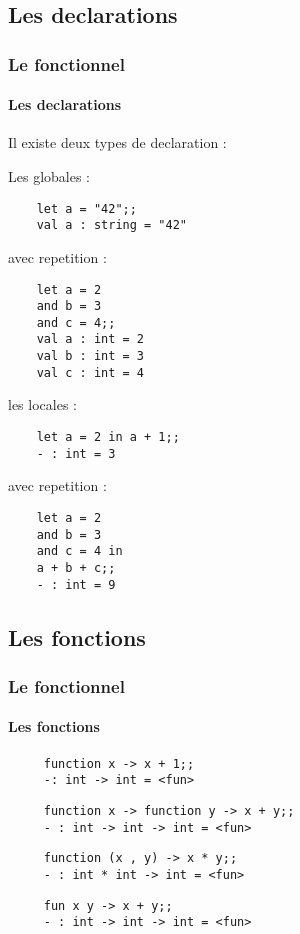     \subsection{Les declarations}
\begin{frame}[fragile]
      \frametitle{Le fonctionnel}
      \framesubtitle{Les declarations}
      Il existe deux types de declaration :
     \begin{minipage}[t]{5cm}
	Les globales :\\
	\begin{lstlisting}
	let a = "42";;
	val a : string = "42"
	\end{lstlisting}
	avec repetition :
	\begin{lstlisting}
	let a = 2
	and b = 3
	and c = 4;;
	val a : int = 2
	val b : int = 3
	val c : int = 4
	\end{lstlisting}
      \end{minipage}
      \begin{minipage}[t]{5cm}
	les locales :\\
	\begin{lstlisting}
	let a = 2 in a + 1;;
	- : int = 3
	\end{lstlisting}
	avec repetition :
	\begin{lstlisting}
	let a = 2
	and b = 3
	and c = 4 in
	a + b + c;;
	- : int = 9
	\end{lstlisting}
      \end{minipage}
\end{frame}


    \subsection{Les fonctions}
\begin{frame}[fragile]
      \frametitle{Le fonctionnel}
      \framesubtitle{Les fonctions}
      \begin{minipage}[t]{7cm}
	\begin{center}
	\begin{itemize}
    \begin{lstlisting}
     function x -> x + 1;;
     -: int -> int = <fun>
    \end{lstlisting}
    \begin{lstlisting}
     function x -> function y -> x + y;;
     - : int -> int -> int = <fun>
    \end{lstlisting}
    \begin{lstlisting}
     function (x , y) -> x * y;;
     - : int * int -> int = <fun>
    \end{lstlisting}
   \begin{lstlisting}
     fun x y -> x + y;;
     - : int -> int -> int = <fun>
    \end{lstlisting}
  \end{itemize}
  \end{center}
  \end{minipage}
\end{frame}

